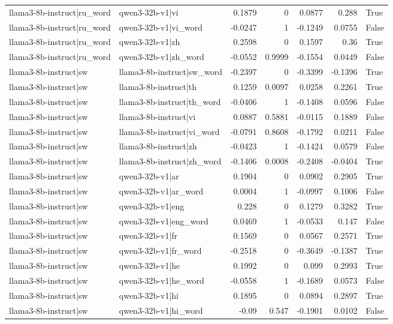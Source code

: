 \begin{table}
\begin{tabular}{l l r r r r l}
llama3-8b-instruct|ru_word & qwen3-32b-v1|vi & 0.1879 & 0 & 0.0877 & 0.288 & True \\
llama3-8b-instruct|ru_word & qwen3-32b-v1|vi_word & -0.0247 & 1 & -0.1249 & 0.0755 & False \\
llama3-8b-instruct|ru_word & qwen3-32b-v1|zh & 0.2598 & 0 & 0.1597 & 0.36 & True \\
llama3-8b-instruct|ru_word & qwen3-32b-v1|zh_word & -0.0552 & 0.9999 & -0.1554 & 0.0449 & False \\
llama3-8b-instruct|sw & llama3-8b-instruct|sw_word & -0.2397 & 0 & -0.3399 & -0.1396 & True \\
llama3-8b-instruct|sw & llama3-8b-instruct|th & 0.1259 & 0.0097 & 0.0258 & 0.2261 & True \\
llama3-8b-instruct|sw & llama3-8b-instruct|th_word & -0.0406 & 1 & -0.1408 & 0.0596 & False \\
llama3-8b-instruct|sw & llama3-8b-instruct|vi & 0.0887 & 0.5881 & -0.0115 & 0.1889 & False \\
llama3-8b-instruct|sw & llama3-8b-instruct|vi_word & -0.0791 & 0.8608 & -0.1792 & 0.0211 & False \\
llama3-8b-instruct|sw & llama3-8b-instruct|zh & -0.0423 & 1 & -0.1424 & 0.0579 & False \\
llama3-8b-instruct|sw & llama3-8b-instruct|zh_word & -0.1406 & 0.0008 & -0.2408 & -0.0404 & True \\
llama3-8b-instruct|sw & qwen3-32b-v1|ar & 0.1904 & 0 & 0.0902 & 0.2905 & True \\
llama3-8b-instruct|sw & qwen3-32b-v1|ar_word & 0.0004 & 1 & -0.0997 & 0.1006 & False \\
llama3-8b-instruct|sw & qwen3-32b-v1|eng & 0.228 & 0 & 0.1279 & 0.3282 & True \\
llama3-8b-instruct|sw & qwen3-32b-v1|eng_word & 0.0469 & 1 & -0.0533 & 0.147 & False \\
llama3-8b-instruct|sw & qwen3-32b-v1|fr & 0.1569 & 0 & 0.0567 & 0.2571 & True \\
llama3-8b-instruct|sw & qwen3-32b-v1|fr_word & -0.2518 & 0 & -0.3649 & -0.1387 & True \\
llama3-8b-instruct|sw & qwen3-32b-v1|he & 0.1992 & 0 & 0.099 & 0.2993 & True \\
llama3-8b-instruct|sw & qwen3-32b-v1|he_word & -0.0558 & 1 & -0.1689 & 0.0573 & False \\
llama3-8b-instruct|sw & qwen3-32b-v1|hi & 0.1895 & 0 & 0.0894 & 0.2897 & True \\
llama3-8b-instruct|sw & qwen3-32b-v1|hi_word & -0.09 & 0.547 & -0.1901 & 0.0102 & False \\

\end{tabular}
\end{table}
